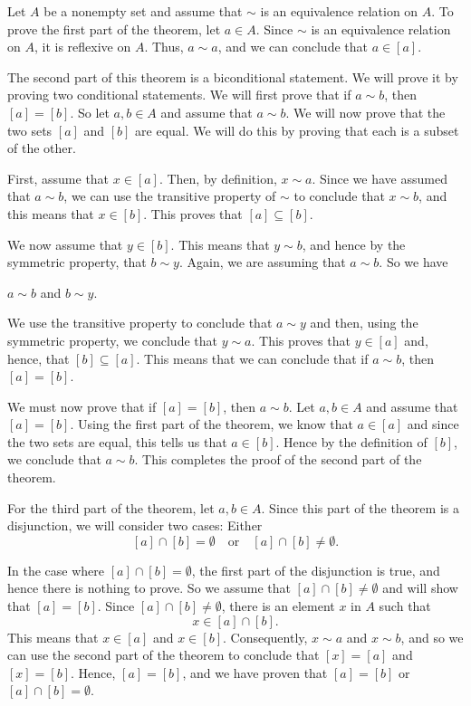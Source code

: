 \begin{myproof}
Let  $A$  be a nonempty set and assume that  $\sim$  is an equivalence relation on  $A$.  To prove the first part of the theorem, let  $a \in A$.  Since  $\sim$ is an equivalence relation on  $A$, it is reflexive on  $A$.  Thus,  $a \sim a$, and we can conclude that  
$a \in [ a ]$.

The second part of this theorem is a biconditional statement.  We will prove it by proving two conditional statements.  We will first prove that  if   $a \sim b$, then  
$[ a ] = [ b ]$.  So let  $a, b \in A$ and assume that  $a \sim b$.  We will now prove that the two sets  $[ a ]$  and  $[ b ]$ are equal.  We will do this by proving that each is a subset of the other. 

First, assume that  $x \in [ a ]$.  Then, by definition,  $x \sim a$.  Since we have assumed that  $a \sim b$, we can use the transitive property of  $\sim$  to conclude that  
$x \sim b$, and this means that  $x \in [ b ]$.  This proves that  
$[ a ] \subseteq [ b ]$.

We now assume that  $y \in [ b ]$.  This means that  $y \sim b$, and hence by the symmetric property, that  $b \sim y$.  Again, we are assuming that  $a \sim b$.  So we have  
\begin{center}
$a \sim b$ and  $b \sim y$.
\end{center}
We use the transitive property to conclude that  $a \sim y$ and then, using the symmetric property, we conclude that  $y \sim a$.  This proves that  $y \in [ a ]$ and, hence, that  $[ b ] \subseteq [ a ]$.  This means that we can conclude that if  $a \sim b$, then  $[ a ] = [ b ]$.

We must now prove that if  $[ a ] = [ b ]$, then  $a \sim b$. Let  
$a, b \in A$ and assume that  $[ a ] = [ b ]$.  Using the first part of the theorem, we know that  $a \in [ a ]$ and since the two sets are equal, this tells us that  $a \in [ b ]$.  Hence by the definition of  $[ b ]$, we conclude that  $a \sim b$.  This completes the proof of the second part of the theorem.

For the third part of the theorem, let  $a, b \in A$.  Since this part of the theorem is a disjunction, we will consider two cases:  Either  
\[
[ a ] \cap [ b ] = \emptyset  \quad \text{or}  \quad
[ a ] \cap [ b ] \ne \emptyset. 
\]
 
In the case  where  $[ a ] \cap [ b ] = \emptyset $, the first part of the disjunction is true, and hence there is nothing to prove.  So we assume that  
$[ a ] \cap [ b ] \ne \emptyset $ and will show that  
$[ a ] = [ b ]$.  Since  
$[ a ] \cap [ b ] \ne \emptyset $, there is an element  $x$  in  $A$  such that
\[
x \in [ a ] \cap [ b ].
\]
This means that  $x \in [ a ]$ and $x \in [ b ]$.  Consequently,  
$x \sim a$  and  $x \sim b$, and so we can use the second part of the theorem to conclude that   
$[ x ] = [ a ]$  and  $[ x ] = [ b ]$.  Hence, 
$[ a ] = [ b ]$, and we have proven that  
$[ a ] = [ b ]$  or  
$[ a ] \cap [ b ] = \emptyset $.
\end{myproof}
%

